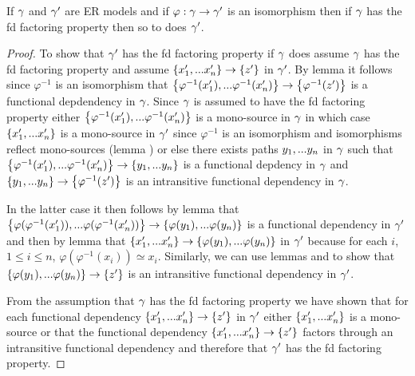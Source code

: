 \begin{lemma}
If $\gamma$ and $\gamma'$ are ER models and if $\varphi:\gamma \rightarrow \gamma'$ is an isomorphism
then if $\gamma$ has the fd factoring property then so to does $\gamma'$.
\end{lemma}
\begin{proof}
To show that $\gamma'$ has the fd factoring property if $\gamma$ does assume $\gamma$ has the fd factoring property and assume $\left\{x'_1,...x'_n\right\} \rightarrow \left\{z'\right\}$ in $\gamma'$. 
By lemma  it follows since $\varphi^{-1}$ is an isomorphism that $\left\{\varphi^{-1}(x'_1),...\varphi^{-1}(x'_n)\right\} \rightarrow \left\{\varphi^{-1}(z')\right\}$ is a functional depdendency
in $\gamma$. Since $\gamma$ is assumed to have the fd factoring property either $\left\{\varphi^{-1}(x'_1),...\varphi^{-1}(x'_n)\right\}$ is a mono-source in $\gamma$ in which case $\left\{x'_1,...x'_n\right\}$ is a mono-source in 
$\gamma'$ since $\varphi^{-1}$ is an isomorphism  and isomorphisms reflect mono-sources (lemma ) or else there exists paths $y_1,...y_n$ in $\gamma$ such that
$\left\{\varphi^{-1}(x'_1),...\varphi^{-1}(x'_n)\right\} \rightarrow \left\{y_1,...y_n\right\}$ is a functional depdency in $\gamma$ and 
 $\left\{y_1,...y_n\right\} \rightarrow \left\{\varphi^{-1}(z')\right\}$ is an intransitive functional dependency in $\gamma$.  

In the latter case it then follows by lemma
 that
 $\left\{\varphi(\varphi^{-1}(x'_1)),...\varphi(\varphi^{-1}(x'_n))\right\} \rightarrow \left\{\varphi(y_1),...\varphi(y_n)\right\}$
is a functional dependency in $\gamma'$
and then by lemma   that $\left\{x'_1,...x'_n\right\} \rightarrow \left\{\varphi(y_1),...\varphi(y_n)\right\}$ in $\gamma'$
because for each $i$, $1 \leq i \leq n$, $\varphi(\varphi^{-1}(x_i)) \simeq x_i$.
Similarly, we can use lemmas  and  to show that $\left\{\varphi(y_1),...\varphi(y_n)\right\} \rightarrow \left\{z'\right\}$ is an intransitive functional dependency in $\gamma'$. 

From the assumption that $\gamma$ has the fd factoring property we have shown that for each functional dependency $\left\{x'_1,...x'_n\right\} \rightarrow \left\{z'\right\}$ in $\gamma'$ either $\left\{x'_1,...x'_n\right\}$ is a mono-source  or
that the functional dependency  $\left\{x'_1,...x'_n\right\} \rightarrow \left\{z'\right\}$ factors through an intransitive functional dependency and  therefore that $\gamma'$ has the fd factoring property.
\end{proof}

